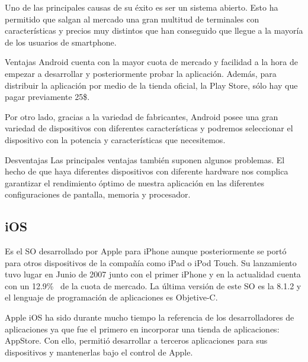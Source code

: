 Uno de las principales causas de su éxito es ser un sistema abierto. Esto ha permitido que salgan al
mercado una gran multitud de terminales con características y precios muy distintos que han
conseguido que llegue a la mayoría de los usuarios de smartphone.

\begin{definitionlist}
  \item[Ventajas] Android cuenta con la mayor cuota de mercado y facilidad a la hora de empezar a
    desarrollar y posteriormente probar la aplicación. Además, para distribuir la aplicación por
    medio de la tienda oficial, la Play Store, sólo hay que pagar previamente 25\$.

    Por otro lado, gracias a la variedad de fabricantes, Android posee una gran variedad de
    dispositivos con diferentes características y podremos seleccionar el dispositivo con la
    potencia y características que necesitemos.

  \item[Desventajas] Las principales ventajas también suponen algunos problemas. El hecho de que
    haya diferentes dispositivos con diferente hardware nos complica garantizar el rendimiento
    óptimo de nuestra aplicación en las diferentes configuraciones de pantalla, memoria y
    procesador.

\end{definitionlist}

\subsection{iOS}

Es el \acs{SO} desarrollado por Apple para iPhone aunque posteriormente se portó para otros
dispositivos de la compañía como iPad o iPod Touch. Su lanzamiento tuvo lugar en Junio de 2007 junto
con el primer iPhone y en la actualidad cuenta con un 12.9\%~\cite{Llamas13} de la cuota de
mercado. La última versión de este \acs{SO} es la 8.1.2 y el lenguaje de programación de
aplicaciones es Objetive-C.

Apple iOS ha sido durante mucho tiempo la referencia de los desarrolladores de aplicaciones ya que
fue el primero en incorporar una tienda de aplicaciones: AppStore. Con ello, permitió desarrollar a
terceros aplicaciones para sus dispositivos y mantenerlas bajo el control de Apple.

